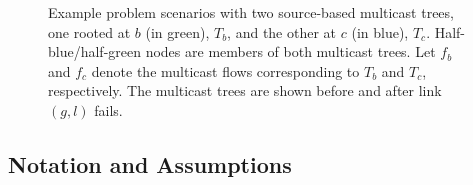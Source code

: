 \begin{figure}[t]
  \begin{center}
  \end{center}
\caption{Example problem scenarios with two source-based multicast trees, one rooted at $b$ (in green), $T_b$, and the other at $c$ (in blue), $T_c$. Half-blue/half-green nodes are members of 
both multicast trees. Let $f_b$ and $f_c$ denote the multicast flows corresponding to $T_b$ and $T_c$, respectively.  The multicast trees are shown before and after link $(g,l)$ fails. }
\label{fig:intuition-example}
\end{figure}


\subsection{Notation and Assumptions}
\label{subsec:notation}


